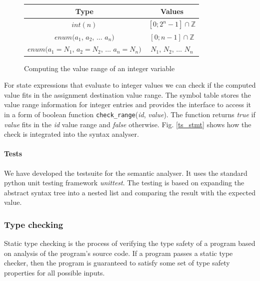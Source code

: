 
\begin{figure}[h!]
\centering
\begin{tabular}{|c|c|}
\hline
Type & Values\\
\hline
$int(n)$ & $[0; 2^{n}-1] \cap \mathbb{Z}$\\
\hline
$enum(a_1$, $a_2$, $\dots$ $a_n)$ & $[0; n-1] \cap \mathbb{Z}$\\
\hline
$enum(a_1=N_1$, $a_2=N_2$, $\dots$ $a_n=N_n)$ & $N_1$, $N_2$, $\dots$ $N_n$\\
\hline
\end{tabular}
\caption{Computing the value range of an integer variable\label{int_range}}
\end{figure}

For state expressions that evaluate to integer values we can check if the computed value fits in the assignment destination value range. The symbol table stores the value range information for integer entries and provides the interface to access it in a form of boolean function \texttt{check\_range}(\emph{id}, \emph{value}). The function returns \emph{true} if \emph{value} fits in the \emph{id} value range and \emph{false} otherwise. Fig. \ref{ts_stmt} shows how the check is integrated into the syntax analyser.



    \paragraph{Tests}
We have developed the testsuite for the semantic analyser. It uses the standard python unit testing framework \emph{unittest}. The testing is based on expanding the abstract syntax tree into a nested list and comparing the result with the expected value.


  \subsubsection{Type checking\label{type_check}}
Static type checking is the process of verifying the type safety of a program based on analysis of the program's source code. If a program passes a static type checker, then the program is guaranteed to satisfy some set of type safety properties for all possible inputs.

